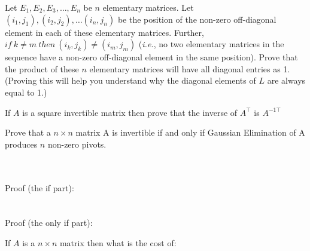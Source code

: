 \documentclass[solution,addpoints,12pt]{exam}
\begin{document}
\begin{questions}

\question[1] Let $E_1, E_2, E_3, \dots, E_n$ be $n$ elementary matrices. Let $(i_1, j_1), (i_2, j_2), \dots (i_n, j_n)$ be the position of the non-zero off-diagonal element in each of these elementary matrices. Further, $if~k \neq m~then~(i_k, j_k) \neq (i_m, j_m)$ (\textit{i.e.}, no two elementary matrices in the sequence have a non-zero off-diagonal element in the same position). Prove that the product of these $n$ elementary matrices will have all diagonal entries as 1. (Proving this will help you understand why the diagonal elements of $L$ are always equal to 1.)
\begin{solution}

\end{solution}

\question[\half] If $A$ is a square invertible matrix then prove that the inverse of $A^\top$ is $A^{-1\top}$
\begin{solution}

\end{solution}

\question[2] Prove that a $n \times n$ matrix A is invertible if and only if Gaussian Elimination of A produces $n$ non-zero pivots. 
\begin{solution}
~\\~\\
Proof (the if part): \\
~\\~\\
Proof (the only if part): \\
\end{solution}

\question[1] If $A$ is a $n\times n$ matrix then what is the cost of:
\begin{parts}

\end{parts}
\end{questions}
\end{document}

